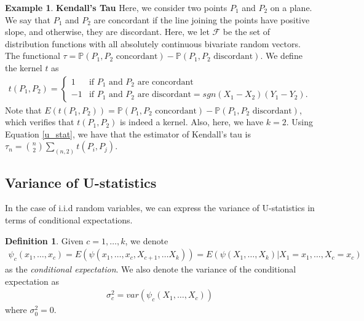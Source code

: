 \documentclass{article}
\theoremstyle{definition}
\newtheorem{Def}{Definition}
\numberwithin{Def}{section}
\newtheorem{ex}{Example}
\begin{document}
\begin{ex}\textbf{Kendall's Tau} Here, we consider two points $P_1$ and $P_2$ on a plane. We say that $P_1$ and $P_2$ are concordant if the line joining the points have positive slope, and otherwise, they are discordant. Here, we let $\mathcal{F}$ be the set of distribution functions with all absolutely continuous bivariate random vectors. The functional $\tau = \mathbb{P}(P_1, P_2 \text{ concordant}) - \mathbb{P}(P_1, P_2 \text{ discordant})$. We define the kernel $t$ as 
\begin{align*}
    t(P_1, P_2) = \begin{cases} 1 & \text{if $P_1$ and $P_2$ are concordant} \\ -1 & \text{if $P_1$ and $P_2$ are discordant} = sgn(X_1 - X_2)(Y_1 - Y_2).
    \end{cases}
\end{align*}
Note that $E(t(P_1, P_2)) = \mathbb{P}(P_1, P_2 \text{ concordant}) - \mathbb{P}(P_1, P_2 \text{ discordant})$, which verifies that $t(P_1, P_2)$ is indeed a kernel. Also, here, we have $k=2$. Using Equation \ref{u_stat}, we have that the estimator of Kendall's tau is $\tau_n = {n \choose 2}\sum_{(n,2)}t(P_i, P_j)$.
\end{ex}

\subsection{Variance of U-statistics}
In the case of i.i.d random variables, we can express the variance of U-statistics in terms of conditional expectations. 

\begin{Def}
Given $c = 1, \dotsc, k$, we denote \begin{align}
    \psi_c(x_1, \dotsc, x_c) = E(\psi(x_1, \dotsc, x_c, X_{c+1}, \dotsc X_k)) = E(\psi(X_1, \dotsc, X_k)|X_1 = x_1, \dotsc, X_c = x_c)
\end{align}
as the \textit{conditional expectation}. We also denote the variance of the conditional expectation as 
\begin{align}
    \sigma_c^2 = var(\psi_c(X_1, \dotsc, X_c))
\end{align}
where $\sigma_0^2 = 0$. 
\end{Def}
\end{document}
